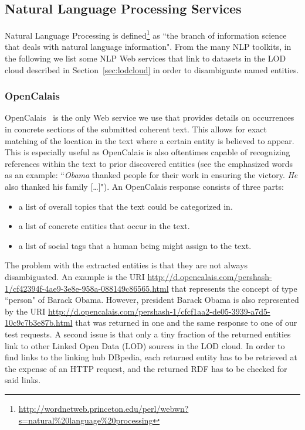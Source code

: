 \documentclass[12pt]{article}
\begin{document}
\subsection{Natural Language Processing Services}\label{sec:nlp-services}
Natural Language Processing is defined\footnote{\url{http://wordnetweb.princeton.edu/perl/webwn?s=natural\%20language\%20processing}} as ``the branch of information science that deals with natural language information". From the many NLP toolkits, in the following we list some NLP Web services that link to datasets in the LOD cloud described in Section~\ref{sec:lodcloud} in order to disambiguate named entities.

\subsubsection{OpenCalais}\label{sec:opencalais}
OpenCalais~\cite{OpenCalais} is the only Web service we use that provides details on occurrences in concrete sections of the submitted coherent text. This allows for exact matching of the location in the text where a certain entity is believed to appear. This is especially useful as OpenCalais is also oftentimes capable of recognizing references within the text to prior discovered entities (see the emphasized words as an example: ``\emph{Obama} thanked people for their work in ensuring the victory. \emph{He} also thanked his family […]"). An OpenCalais response consists of three parts:

\begin{itemize}
\item a list of overall topics that the text could be categorized in.
\item a list of concrete entities that occur in the text.
\item a list of social tags that a human being might assign to the text.
\end{itemize}

The problem with the extracted entities is that they are not always disambiguated. An example is the URI \url{http://d.opencalais.com/pershash-1/cf42394f-4ae9-3e8e-958a-088149c86565.html} that represents the concept of type ``person" of Barack Obama. However, president Barack Obama is also represented by the URI \url{http://d.opencalais.com/pershash-1/cfcf1aa2-de05-3939-a7d5-10c9c7b3e87b.html} that was returned in one and the same response to one of our test requests. A second issue is that only a tiny fraction of the returned entities link to other Linked Open Data (LOD) sources in the LOD cloud. In order to find links to the linking hub DBpedia, each returned entity has to be retrieved at the expense of an HTTP request, and the returned RDF has to be checked for said links.
\end{document}
